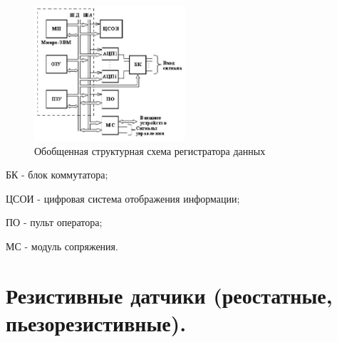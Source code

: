 \documentclass[unicode, 12pt, a4paper, oneside]{article}
\begin{document}
\begin{figure}[H]
\centering
\includegraphics[width=0.5\textwidth]{56.jpg}
\caption{Обобщенная структурная схема регистратора данных}
\end{figure}
БК - блок коммутатора;

ЦСОИ - цифровая система отображения информации;

ПО - пульт оператора;

МС - модуль сопряжения.

\section{Резистивные датчики (реостатные, пьезорезистивные).}
\end{document}
